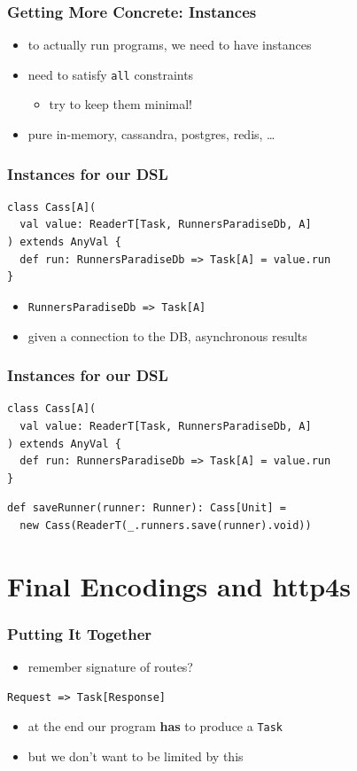 \documentclass{beamer}
\begin{document}
\begin{frame}
  \frametitle{Getting More Concrete: Instances}
  \begin{itemize}
  \item to actually run programs, we need to have instances
  \item need to satisfy \texttt{all} constraints
    \begin{itemize}
    \item try to keep them minimal!
    \end{itemize}
  \item pure in-memory, cassandra, postgres, redis, \dots{}
  \end{itemize}
\end{frame}

\begin{frame}
  \frametitle{Instances for our DSL}
\begin{verbatim}
class Cass[A](
  val value: ReaderT[Task, RunnersParadiseDb, A]
) extends AnyVal {
  def run: RunnersParadiseDb => Task[A] = value.run
}
\end{verbatim}
  \begin{itemize}
  \item \texttt{RunnersParadiseDb => Task[A]}
  \item given a connection to the DB, asynchronous results
  \end{itemize}
\end{frame}

\begin{frame}
  \frametitle{Instances for our DSL}
\begin{verbatim}
class Cass[A](
  val value: ReaderT[Task, RunnersParadiseDb, A]
) extends AnyVal {
  def run: RunnersParadiseDb => Task[A] = value.run
}
\end{verbatim}
  \vfill
\begin{verbatim}
def saveRunner(runner: Runner): Cass[Unit] =
  new Cass(ReaderT(_.runners.save(runner).void))
\end{verbatim}
\end{frame}

\section{Final Encodings and http4s}

\begin{frame}[fragile]
  \frametitle{Putting It Together}
  \begin{itemize}
  \item remember signature of routes?
  \end{itemize}
\begin{verbatim}
Request => Task[Response]
\end{verbatim}
  \begin{itemize}
  \item at the end our program \textbf{has} to produce a \texttt{Task}
  \item but we don't want to be limited by this
  \end{itemize}
\end{frame}
\end{document}
